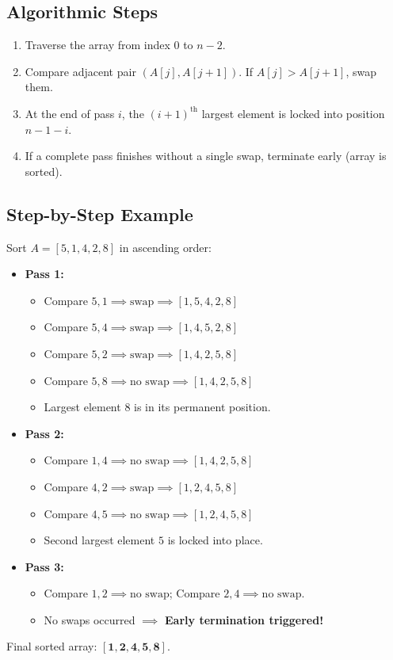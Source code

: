 \subsection{Algorithmic Steps}
\begin{enumerate}
    \item Traverse the array from index $0$ to $n-2$.
    \item Compare adjacent pair $(A[j], A[j+1])$. If $A[j] > A[j+1]$, swap them.
    \item At the end of pass $i$, the $(i+1)^{\text{th}}$ largest element is locked into position $n - 1 - i$.
    \item If a complete pass finishes without a single swap, terminate early (array is sorted).
\end{enumerate}

\subsection{Step-by-Step Example}
Sort $A = [5, 1, 4, 2, 8]$ in ascending order:
\begin{itemize}
    \item \textbf{Pass 1:}
    \begin{itemize}
        \item Compare $5, 1 \implies \text{swap} \implies [1, 5, 4, 2, 8]$
        \item Compare $5, 4 \implies \text{swap} \implies [1, 4, 5, 2, 8]$
        \item Compare $5, 2 \implies \text{swap} \implies [1, 4, 2, 5, 8]$
        \item Compare $5, 8 \implies \text{no swap} \implies [1, 4, 2, 5, 8]$
        \item Largest element $8$ is in its permanent position.
    \end{itemize}
    \item \textbf{Pass 2:}
    \begin{itemize}
        \item Compare $1, 4 \implies \text{no swap} \implies [1, 4, 2, 5, 8]$
        \item Compare $4, 2 \implies \text{swap} \implies [1, 2, 4, 5, 8]$
        \item Compare $4, 5 \implies \text{no swap} \implies [1, 2, 4, 5, 8]$
        \item Second largest element $5$ is locked into place.
    \end{itemize}
    \item \textbf{Pass 3:}
    \begin{itemize}
        \item Compare $1, 2 \implies \text{no swap}$; Compare $2, 4 \implies \text{no swap}$.
        \item No swaps occurred $\implies$ \textbf{Early termination triggered!}
    \end{itemize}
\end{itemize}
Final sorted array: $\mathbf{[1, 2, 4, 5, 8]}$.

